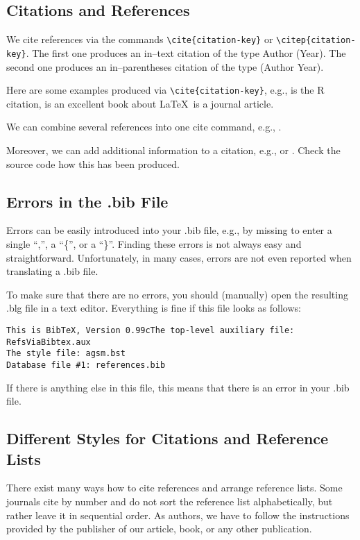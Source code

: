 \documentclass[12pt]{article}
\begin{document}
\subsection{Citations and References}

We cite references via the commands \verb|\cite{citation-key}|
or \verb|\citep{citation-key}|. The first one produces
an in--text citation of the type Author (Year). The second one
produces an in--parentheses citation of the type (Author Year).

Here are some examples produced via \verb|\cite{citation-key}|,
e.g., \cite{R} is the R citation,
\cite{Lamport86} is an excellent book about \LaTeX\, \cite{RF} is
a journal article.

We can combine several references into one cite command, e.g.,
\citep{R,Lamport85,RF}.

Moreover, we can add additional information to a citation, e.g.,
\citep[p.~5]{RF} or \citep[see for example][p.~5]{RF}.
Check the source code how this has been produced.

\subsection{Errors in the .bib File}

Errors can be easily introduced into your .bib file, e.g., by missing to
enter a single ``,'', a ``\{'', or a ``\}''. Finding these errors is not
always easy and straightforward. Unfortunately, in many cases,
errors are not even reported when translating a .bib file.

To make sure that there are no errors, you should (manually)
open the resulting .blg file in a text editor. Everything
is fine if this file looks as follows:
\begin{verbatim}
This is BibTeX, Version 0.99cThe top-level auxiliary file: RefsViaBibtex.aux
The style file: agsm.bst
Database file #1: references.bib
\end{verbatim}

If there is anything else in this file, this means that there is an 
error in your .bib file.

\subsection{Different Styles for Citations and Reference Lists}

There exist many ways how to cite references and arrange reference lists.
Some journals cite by number and do not sort the reference list 
alphabetically, but rather leave it in sequential order. As authors,
we have to follow the instructions provided by the publisher
of our article, book, or any other publication.
\end{document}
